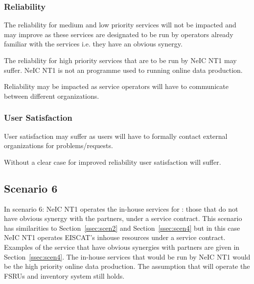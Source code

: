 \documentclass[12pt,a4paper]{article}
\newcommand{\nnt}{NeIC NT1\xspace}
\begin{document}
\subsubsection*{Reliability}
\bitm
  \item The reliability for medium and low priority services will not be impacted and may improve as these services are designated to be run by operators already familiar with the services i.e. they have an obvious synergy.
  \item The reliability for high priority services that are to be run by \nnt may suffer. \nnt is not an programme used to running online data production.
  \item {Reliability may be impacted as service operators will have to communicate between different organizations.}
\eitm

\subsubsection*{User Satisfaction}
\bitm
\item User satisfaction may suffer as \EC users will have to formally contact external organizations for problems/requests.
  \item Without a clear case for improved reliability user satisfaction will suffer.
\eitm

\subsection{Scenario 6}
\label{ssec:scen6}

In scenario 6: \nnt operates the in-house services for \EC: those that do not have obvious synergy with the \EC partners,
under a service contract.
This scenario has similarities to Section~\ref{ssec:scen2} and Section~\ref{ssec:scen4} but
in this case \nnt operates EISCAT's inhouse resources under a service contract.
Examples of the \ED service that have obvious synergies with partners are given in Section~\ref{ssec:scen4}.
The in-house \ED services that would be run by \nnt would be the high priority online data production.
The assumption that \EC will operate the FSRUs and inventory system still holds.

\end{document}
